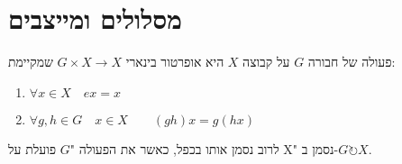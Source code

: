 \documentclass{tstextbook}
\begin{document}

\section{מסלולים ומייצבים}

\begin{definition}
פעולה של חבורה \(G\) על קבוצה \(X\) היא אופרטור בינארי \(G\times X\to X\) שמקיימת:

\end{definition}
\begin{enumerate}
  \item \(\forall x \in X\quad ex=x\)


  \item \(\forall g,h \in G \quad x \in X \qquad (gh)x=g(hx)\)


\end{enumerate}
לרוב נסמן אותו בכפל, כאשר את הפעולה "\(G\) פועלת על X" נסמן ב-\(G\circlearrowright X\).
\end{document}
